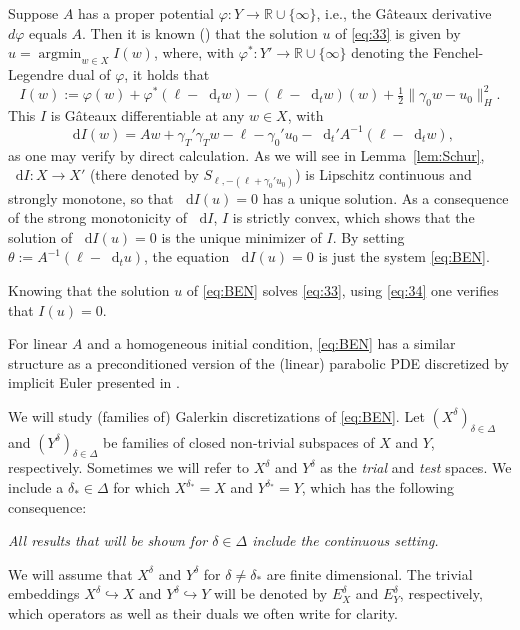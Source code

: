 \documentclass{amsart}
\makeatletter
\newcommand*\bigcdot{\mathpalette\bigcdot@{.5}}
\newcommand*\bigcdot@[2]{\mathbin{\vcenter{\hbox{\scalebox{#2}{$\m@th#1\bullet$}}}}}
\numberwithin{equation}{section}
\newcommand{\R}{\mathbb R}
\DeclareMathOperator*{\argmin}{argmin}
\newcommand{\1}{\mathbb 1}
\newcommand*\diff{\mathop{}\!\mathrm{d}}
\makeatother
\begin{document}
\begin{remark} Suppose $A$ has a proper potential $\varphi\colon Y \rightarrow \R \cup \{\infty\}$, i.e., the G\^{a}teaux derivative $d\varphi$ equals $A$. Then it is known (\cite{15.35,75.374}) that the solution $u$ of \eqref{eq:33} is given by $u=\argmin_{w \in X} I(w)$, where, with $\varphi^*\colon Y' \rightarrow \R \cup\{\infty\}$ denoting the Fenchel-Legendre dual of $\varphi$, it holds that
$$
I(w):=\varphi(w)+\varphi^*(\ell-\diff_t w) - (\ell-\diff_t w)(w)+\tfrac12\|\gamma_0 w-u_0\|_H^2.
$$
This $I$ is G\^{a}teaux differentiable at any $w \in X$, with
$$
\diff I(w)=A w+\gamma_T'\gamma_T w-\ell-\gamma_0' u_0-\diff_t' A^{-1}(\ell-\diff_t w),
$$
as one may verify by direct calculation.
As we will see in Lemma~\ref{lem:Schur}, $\diff I\colon X \rightarrow X'$ (there denoted by $S_{\ell,-(\ell+\gamma_0' u_0)}$) is Lipschitz continuous and strongly monotone, so that $\diff I(u)=0$ has a unique solution.
As a consequence of the strong monotonicity of $\diff I$, $I$ is strictly convex, which shows that the solution of $\diff I(u)=0$ is the unique minimizer of $I$.
By setting $\theta:=A^{-1}(\ell-\diff_tu)$, the equation $\diff I(u)=0$ is just the system \eqref{eq:BEN}.

Knowing that the solution $u$ of \eqref{eq:BEN} solves \eqref{eq:33}, using \eqref{eq:34} one verifies that $I(u)=0$.
\end{remark}

\begin{remark}
For linear $A$ and a homogeneous initial condition, \eqref{eq:BEN} has a similar structure as a preconditioned version  of the (linear) parabolic PDE discretized by implicit Euler presented in \cite{234.7}.
\end{remark}

We will study (families of) Galerkin discretizations of \eqref{eq:BEN}. 
Let $(X^\delta)_{\delta \in \Delta}$ and $(Y^\delta)_{\delta \in \Delta}$ be families of closed non-trivial subspaces of $X$ and $Y$, respectively.
Sometimes we will refer to $X^\delta$ and $Y^\delta$ as the \emph{trial} and \emph{test} spaces.
We include a $\delta_* \in \Delta$ for which $X^{\delta_*}=X$ and $Y^{\delta_*}=Y$, which has the following consequence:\vspace*{.5ex}
\begin{center}
\emph{All results that will be shown for $\delta \in \Delta$ include the continuous setting.}
\end{center}
We will assume that $X^\delta$ and $Y^\delta$ for $\delta \neq \delta_*$  are finite dimensional. The trivial embeddings $X^\delta \hookrightarrow X$ and $Y^\delta \hookrightarrow Y$ will be denoted by $E_X^\delta$ and $E_Y^\delta$, respectively, which operators as well as their duals we often write for clarity.
\smallskip
\end{document}
